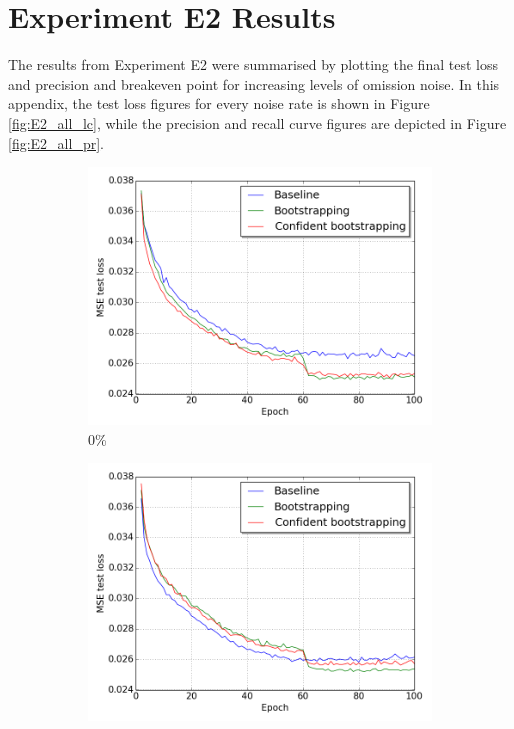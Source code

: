 \pagebreak
\section{Experiment E2 Results}
\label{app:fullE5results}
The results from Experiment E2 were summarised by plotting the final test loss and precision and breakeven point for increasing levels of omission noise. In this appendix, the test loss figures for every noise rate is shown in Figure \ref{fig:E2_all_lc}, while the precision and recall curve figures are depicted in Figure \ref{fig:E2_all_pr}.


\begin{figure}[H]
\begin{subfigure}{0.3\textwidth}
\includegraphics[width=\textwidth]{figs/E2/lc_0.png}
\caption{ 0\% } \label{fig:app_E2_0_lc}
\vspace{-0.1cm} %
\end{subfigure}
\hspace*{\fill} %
\begin{subfigure}{0.31\textwidth}
\includegraphics[width=\textwidth]{figs/E2/lc_1.png}

\end{subfigure}
\end{figure}
